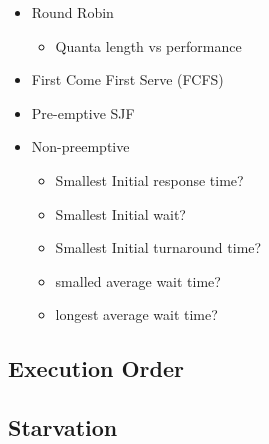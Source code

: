 \documentclass[11pt]{article}
\begin{document}
\begin{itemize}

\item Round Robin\\
\label{sec-7.2.7.1}

\begin{itemize}

\item Quanta length vs performance\\
\label{sec-7.2.7.1.1}

\end{itemize} %

\item First Come First Serve (FCFS)\\
\label{sec-7.2.7.2}


\item Pre-emptive SJF\\
\label{sec-7.2.7.3}


\item Non-preemptive\\
\label{sec-7.2.7.4}

\begin{itemize}

\item Smallest Initial response time?\\
\label{sec-7.2.7.4.1}


\item Smallest Initial wait?\\
\label{sec-7.2.7.4.2}


\item Smallest Initial turnaround time?\\
\label{sec-7.2.7.4.3}


\item smalled average wait time?\\
\label{sec-7.2.7.4.4}


\item longest average wait time?\\
\label{sec-7.2.7.4.5}

\end{itemize} %
\end{itemize} %
\subsection{Execution Order}
\label{sec-7.3}

\subsection{Starvation}
\label{sec-7.4}
\end{document}
